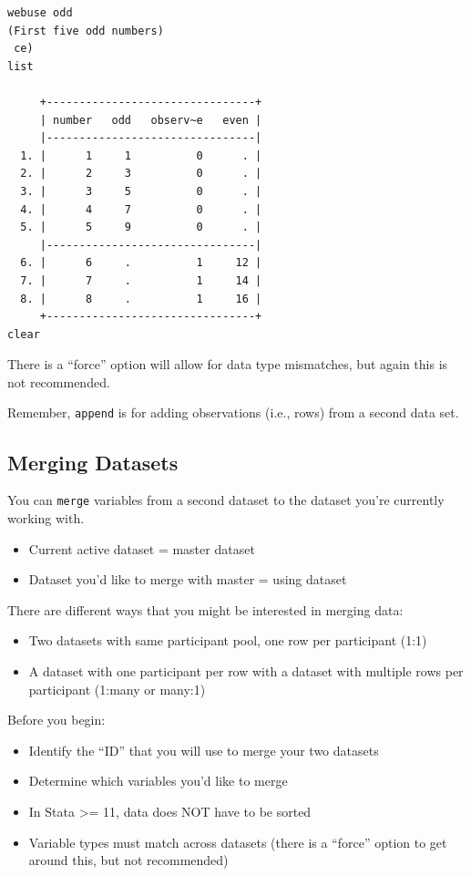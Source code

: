 \documentclass[]{book}
\providecommand{\tightlist}{%
  \setlength{\itemsep}{0pt}\setlength{\parskip}{0pt}}
\begin{document}
\begin{verbatim}
webuse odd
(First five odd numbers)
 ce)
list

     +--------------------------------+
     | number   odd   observ~e   even |
     |--------------------------------|
  1. |      1     1          0      . |
  2. |      2     3          0      . |
  3. |      3     5          0      . |
  4. |      4     7          0      . |
  5. |      5     9          0      . |
     |--------------------------------|
  6. |      6     .          1     12 |
  7. |      7     .          1     14 |
  8. |      8     .          1     16 |
     +--------------------------------+
clear
\end{verbatim}

There is a ``force'' option will allow for data type mismatches, but
again this is not recommended.

Remember, \texttt{append} is for adding observations (i.e., rows) from a
second data set.

\subsection{Merging Datasets}\label{merging-datasets}

You can \texttt{merge} variables from a second dataset to the dataset
you're currently working with.

\begin{itemize}
\tightlist
\item
  Current active dataset = master dataset
\item
  Dataset you'd like to merge with master = using dataset
\end{itemize}

There are different ways that you might be interested in merging data:

\begin{itemize}
\tightlist
\item
  Two datasets with same participant pool, one row per participant (1:1)
\item
  A dataset with one participant per row with a dataset with multiple
  rows per participant (1:many or many:1)
\end{itemize}

Before you begin:

\begin{itemize}
\tightlist
\item
  Identify the ``ID'' that you will use to merge your two datasets
\item
  Determine which variables you'd like to merge
\item
  In Stata \textgreater{}= 11, data does NOT have to be sorted
\item
  Variable types must match across datasets (there is a ``force'' option
  to get around this, but not recommended)
\end{itemize}
\end{document}
